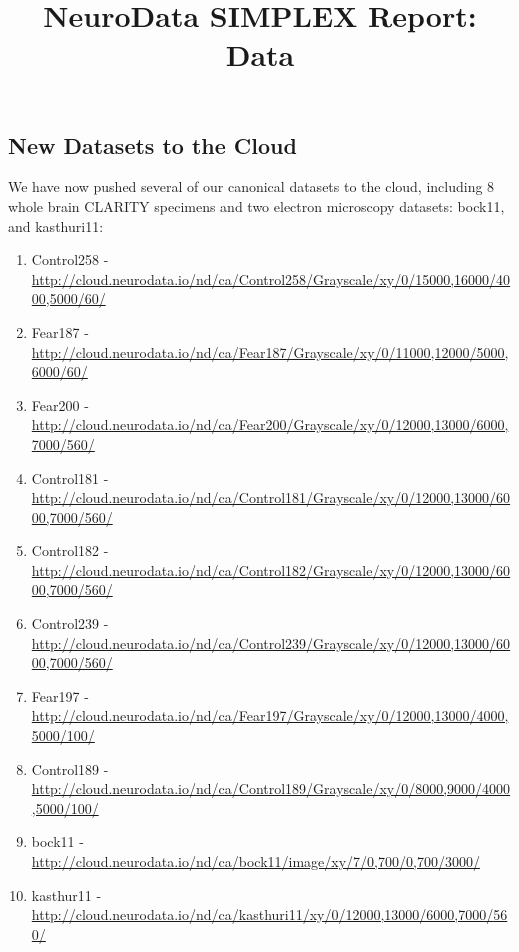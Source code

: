 \documentclass[simplex.tex]{subfiles}
\title{NeuroData SIMPLEX Report: Data}
\begin{document}

\subsection{New Datasets to the Cloud}
We have now pushed several of our canonical datasets to the cloud,
including 8 whole brain CLARITY specimens and two electron microscopy
datasets: bock11, and kasthuri11:

\begin{enumerate}
\item Control258 -
  \url{http://cloud.neurodata.io/nd/ca/Control258/Grayscale/xy/0/15000,16000/4000,5000/60/}
\item Fear187 -
  \url{http://cloud.neurodata.io/nd/ca/Fear187/Grayscale/xy/0/11000,12000/5000,6000/60/}
\item Fear200 -
  \url{http://cloud.neurodata.io/nd/ca/Fear200/Grayscale/xy/0/12000,13000/6000,7000/560/}
\item Control181 -
\url{http://cloud.neurodata.io/nd/ca/Control181/Grayscale/xy/0/12000,13000/6000,7000/560/}
\item Control182 -
  \url{http://cloud.neurodata.io/nd/ca/Control182/Grayscale/xy/0/12000,13000/6000,7000/560/}
\item Control239 -
  \url{http://cloud.neurodata.io/nd/ca/Control239/Grayscale/xy/0/12000,13000/6000,7000/560/}
\item Fear197 -
  \url{http://cloud.neurodata.io/nd/ca/Fear197/Grayscale/xy/0/12000,13000/4000,5000/100/}
\item Control189 -
  \url{http://cloud.neurodata.io/nd/ca/Control189/Grayscale/xy/0/8000,9000/4000,5000/100/}
\item bock11 -
  \url{http://cloud.neurodata.io/nd/ca/bock11/image/xy/7/0,700/0,700/3000/} 
\item kasthur11 -
  \url{http://cloud.neurodata.io/nd/ca/kasthuri11/xy/0/12000,13000/6000,7000/560/}
\end{enumerate}
\end{document}
